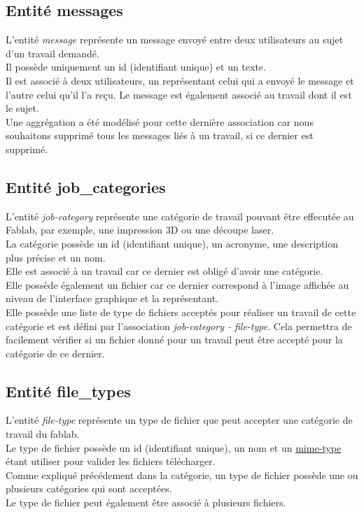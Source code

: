\documentclass[
    iai, %
    il, %
]{heig-tb}
\begin{document}
\subsection{Entité messages}
L'entité \emph{message} représente un message envoyé entre deux utilisateurs au sujet d'un travail demandé.\\
Il possède uniquement un id (identifiant unique) et un texte.\\
Il est associé à deux utilisateurs, un représentant celui qui a envoyé le message et l'autre celui qu'il l'a reçu. Le message est également associé au travail dont il est le sujet.\\
Une aggrégation a été modélisé pour cette dernière association car nous souhaitons supprimé tous les messages liés à un travail, si ce dernier est supprimé.

\subsection{Entité job\_categories}
L'entité \emph{job-category} représente une catégorie de travail pouvant être effecutée au Fablab, par exemple, une impression 3D ou une découpe laser.\\
La catégorie possède un id (identifiant unique), un acronyme, une description plus précise et un nom.\\
Elle est associé à un travail car ce dernier est obligé d'avoir une catégorie.\\
Elle possède également un fichier car ce dernier correspond à l'image affichée au niveau de l'interface graphique et la représentant. \\
Elle possède une liste de type de fichiers acceptés pour réaliser un travail de cette catégorie et est défini par l'association \emph{job-category - file-type}. Cela permettra de facilement vérifier si un fichier donné pour un travail peut être accepté pour la catégorie de ce dernier.

\subsection{Entité file\_types}
L'entité \emph{file-type} représente un type de fichier que peut accepter une catégorie de travail du \Gls{fablab}.\\
Le type de fichier possède un id (identifiant unique), un nom et un \href{https://developer.mozilla.org/fr/docs/Web/HTTP/Basics_of_HTTP/MIME_Types}{mime-type} étant utiliser pour valider les fichiers télécharger.\\
Comme expliqué précédement dans la catégorie, un type de fichier possède une ou plusieurs catégories qui sont acceptées.\\
Le type de fichier peut également être associé à plusieurs fichiers.
\end{document}
